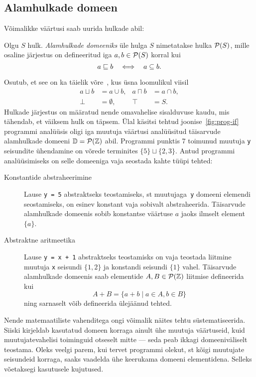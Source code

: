 \documentclass[../thesis.tex]{subfiles}
\begin{document}
\subsection{Alamhulkade domeen}
Võimalikke väärtusi saab uurida hulkade abil:
\begin{definition}
Olgu $S$ hulk. \emph{Alamhulkade domeeniks} üle hulga $S$ nimetatakse hulka $\mathcal{P}(S)$, mille osaline järjestus on defineeritud iga $a, b \in \mathcal{P}(S)$ korral kui
\[
	a \sqsubseteq b \quad\Longleftrightarrow\quad a \subseteq b.
\]
\end{definition}
Osutub, et see on ka täielik võre~\cite[6]{laan_voreteooria}, kus üsna loomulikul viisil
\begin{align*}
	a \sqcup b &= a \cup b, &
	a \sqcap b &= a \cap b, \\
	\bot &= \emptyset, &
	\top &= S.
\end{align*}
Hulkade järjestus on määratud nende omavahelise sisalduvuse kaudu, mis tähendab, et väiksem hulk on täpsem. Ülal käsitsi tehtud joonise~\ref{fig:prog-if} programmi analüüsis oligi iga muutuja väärtusi analüüsitud täisarvude alamhulkade domeeni $\mathbb{D} = \mathcal{P}(\mathbb{Z})$ abil. Programmi punktis 7 toimunud muutuja \texttt{y} seisundite ühendamine on võrede terminites $\{5\} \sqcup \{2, 3\}$. Antud programmi analüüsimiseks on selle domeeniga vaja seostada kahte tüüpi tehted:
\begin{description}
	\item[Konstantide abstraheerimine] Lause \texttt{y = 5} abstraktseks teostamiseks, st muutujaga~\texttt{y} domeeni elemendi seostamiseks, on esinev konstant vaja sobivalt abstraheerida. Täisarvude alamhulkade domeenis sobib konstantse väärtuse $a$ jaoks ilmselt element $\{a\}$.

	\item[Abstraktne aritmeetika] Lause \texttt{y = x + 1} abstraktseks teostamisks on vaja teostada liitmine muutuja \texttt{x} seisundi $\{1, 2\}$ ja konstandi seisundi $\{1\}$ vahel. Täisarvude alamhulkade domeenis saab elementide $A, B \in \mathcal{P}(\mathbb{Z})$ liitmise defineerida kui
	\[
		A + B = \{a + b \mid a \in A, b \in B\}
	\]
	ning sarnaselt võib defineerida ülejäänud tehted.
\end{description}

Nende matemaatiliste vahenditega ongi võimalik näites tehtu süstematiseerida. Siiski kirjeldab kasutatud domeen korraga ainult ühe muutuja väärtuseid, kuid muutujatevahelisi toiminguid otseselt mitte --- seda peab ikkagi domeeniväliselt teostama. Oleks veelgi parem, kui tervet programmi olekut, st kõigi muutujate seisundeid korraga, saaks vaadelda ühe keerukama domeeni elementidena. Selleks võetaksegi kasutusele kujutused.
\end{document}
